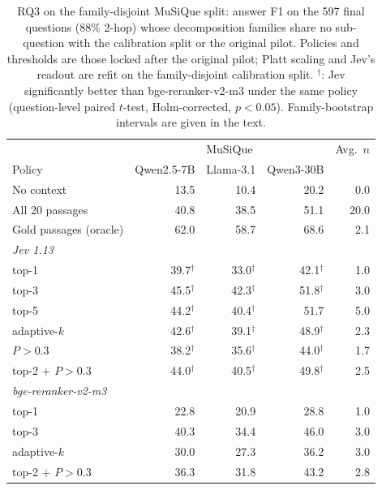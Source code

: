\begin{table}[t]
\centering
\footnotesize
\setlength{\tabcolsep}{4pt}
\caption{RQ3 on the family-disjoint MuSiQue split: answer F1 on the 597 final questions (88\% 2-hop) whose decomposition families share no sub-question with the calibration split or the original pilot. Policies and thresholds are those locked after the original pilot; Platt scaling and Jev's readout are refit on the family-disjoint calibration split. $^\dagger$: Jev significantly better than bge-reranker-v2-m3 under the same policy (question-level paired $t$-test, Holm-corrected, $p<0.05$). Family-bootstrap intervals are given in the text.}
\label{tab:rag-fd}
\begin{tabular}{lrrrr}
\toprule
 & \multicolumn{3}{c}{MuSiQue} & Avg.\ $n$ \\
Policy & Qwen2.5-7B & Llama-3.1 & Qwen3-30B &  \\
\midrule
No context & 13.5 & 10.4 & 20.2 & 0.0 \\
All 20 passages & 40.8 & 38.5 & 51.1 & 20.0 \\
Gold passages (oracle) & 62.0 & 58.7 & 68.6 & 2.1 \\
\multicolumn{5}{l}{\textit{Jev 1.13}} \\
\quad top-1 & 39.7$^\dagger$ & 33.0$^\dagger$ & 42.1$^\dagger$ & 1.0 \\
\quad top-3 & 45.5$^\dagger$ & 42.3$^\dagger$ & 51.8$^\dagger$ & 3.0 \\
\quad top-5 & 44.2$^\dagger$ & 40.4$^\dagger$ & 51.7 & 5.0 \\
\quad adaptive-$k$ & 42.6$^\dagger$ & 39.1$^\dagger$ & 48.9$^\dagger$ & 2.3 \\
\quad $P>0.3$ & 38.2$^\dagger$ & 35.6$^\dagger$ & 44.0$^\dagger$ & 1.7 \\
\quad top-2 $+$ $P>0.3$ & 44.0$^\dagger$ & 40.5$^\dagger$ & 49.8$^\dagger$ & 2.5 \\
\multicolumn{5}{l}{\textit{bge-reranker-v2-m3}} \\
\quad top-1 & 22.8 & 20.9 & 28.8 & 1.0 \\
\quad top-3 & 40.3 & 34.4 & 46.0 & 3.0 \\
\quad adaptive-$k$ & 30.0 & 27.3 & 36.2 & 3.0 \\
\quad top-2 $+$ $P>0.3$ & 36.3 & 31.8 & 43.2 & 2.8 \\
\bottomrule
\end{tabular}
\end{table}